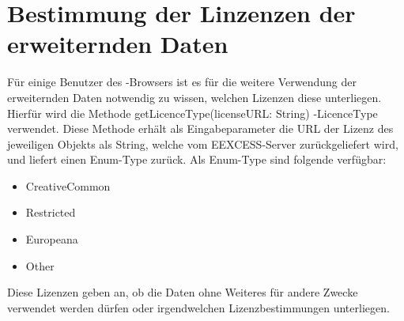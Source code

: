 
\chapter{Bestimmung der Linzenzen der erweiternden Daten}
Für einige Benutzer des \SECH-Browsers ist es für die weitere Verwendung der erweiternden Daten notwendig zu wissen, welchen Lizenzen diese unterliegen. Hierfür wird die Methode \glqq getLicenceType(licenseURL: String) -\frq LicenceType \grqq verwendet. Diese Methode erhält als Eingabeparameter die URL der Lizenz des jeweiligen Objekts als String, welche vom EEXCESS-Server zurückgeliefert wird, und liefert einen Enum-Type zurück. Als Enum-Type sind folgende verfügbar:
\begin{itemize}
	\item CreativeCommon
	\item Restricted
	\item Europeana
	\item Other
\end{itemize}

Diese Lizenzen geben an, ob die Daten ohne Weiteres für andere Zwecke verwendet werden dürfen oder irgendwelchen Lizenzbestimmungen unterliegen.

